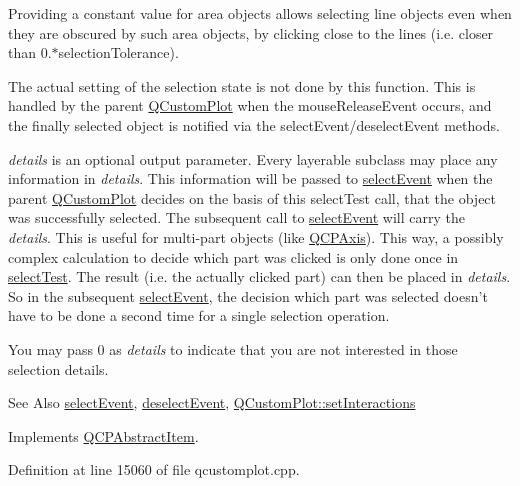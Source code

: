 Providing a constant value for area objects allows selecting line objects even when they are obscured by such area objects, by clicking close to the lines (i.\-e. closer than 0.$\ast$selection\-Tolerance).

The actual setting of the selection state is not done by this function. This is handled by the parent \hyperlink{class_q_custom_plot}{Q\-Custom\-Plot} when the mouse\-Release\-Event occurs, and the finally selected object is notified via the select\-Event/deselect\-Event methods.

{\itshape details} is an optional output parameter. Every layerable subclass may place any information in {\itshape details}. This information will be passed to \hyperlink{class_q_c_p_abstract_item_aaf92af7b9893712959a6c073d334d88d}{select\-Event} when the parent \hyperlink{class_q_custom_plot}{Q\-Custom\-Plot} decides on the basis of this select\-Test call, that the object was successfully selected. The subsequent call to \hyperlink{class_q_c_p_abstract_item_aaf92af7b9893712959a6c073d334d88d}{select\-Event} will carry the {\itshape details}. This is useful for multi-\/part objects (like \hyperlink{class_q_c_p_axis}{Q\-C\-P\-Axis}). This way, a possibly complex calculation to decide which part was clicked is only done once in \hyperlink{class_q_c_p_item_curve_a741375c11667b5f9c95b2683f93ee514}{select\-Test}. The result (i.\-e. the actually clicked part) can then be placed in {\itshape details}. So in the subsequent \hyperlink{class_q_c_p_abstract_item_aaf92af7b9893712959a6c073d334d88d}{select\-Event}, the decision which part was selected doesn't have to be done a second time for a single selection operation.

You may pass 0 as {\itshape details} to indicate that you are not interested in those selection details.

\begin{DoxySeeAlso}{See Also}
\hyperlink{class_q_c_p_abstract_item_aaf92af7b9893712959a6c073d334d88d}{select\-Event}, \hyperlink{class_q_c_p_abstract_item_a91f090d6763cfedb0749219c63788ae9}{deselect\-Event}, \hyperlink{class_q_custom_plot_a5ee1e2f6ae27419deca53e75907c27e5}{Q\-Custom\-Plot\-::set\-Interactions} 
\end{DoxySeeAlso}


Implements \hyperlink{class_q_c_p_abstract_item_a96d522d10ffc0413b9a366c6f7f0476b}{Q\-C\-P\-Abstract\-Item}.



Definition at line 15060 of file qcustomplot.\-cpp.

